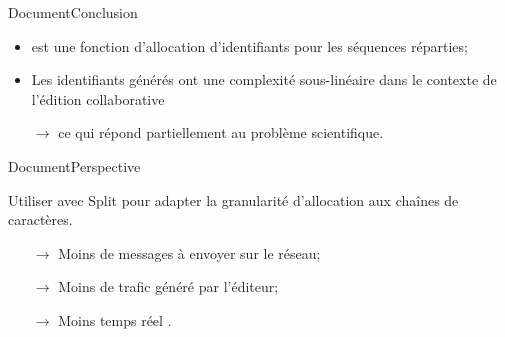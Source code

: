 







\begin{frame}{Document}{Conclusion}

  \begin{itemize}
  \item \LSEQ est une fonction d'allocation d'identifiants pour les séquences
    réparties;
    \vspace{0.5cm}
  \item Les identifiants générés ont une complexité sous-linéaire dans le contexte
    de l'édition collaborative
  \item [$\rightarrow$] ce qui répond partiellement au problème scientifique.
  \end{itemize}


  
  
\end{frame}


\begin{frame}{Document}{Perspective}
  
  Utiliser \LSEQ avec \og Split \fg{} pour
  adapter la granularité d'allocation aux chaînes de caractères.
  \vspace{0.75cm}
  \begin{itemize}
  \item [$\rightarrow$] Moins de messages à envoyer sur le réseau;
  \item [$\rightarrow$] Moins de trafic généré par l'éditeur;
  \item [$\rightarrow$] Moins \og temps réel \fg.
  \end{itemize}

\end{frame}

